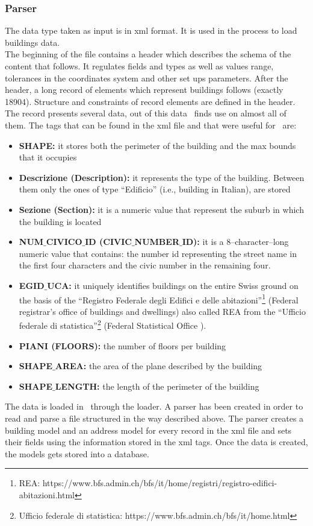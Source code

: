 \subsubsection{Parser}
The data type taken as input is in xml format. It is used in the process to load buildings data.\\
The beginning of the file contains a header which describes the schema of the content that follows.
It regulates fields and types as well as values range, tolerances in the coordinates system and other set ups parameters. After the header, a long record of elements which represent buildings follows (exactly 18904). Structure and constraints of record elements are defined in the header. The record presents several data, out of this data  \applicationName\ finds use on almost all of them. The tags that can be found in the xml file and that were useful for \applicationName\ are:
\begin{itemize}
	\item {\bf SHAPE:} it stores both the perimeter of the building and the max bounds that it occupies
	\item {\bf Descrizione (Description):} it represents the type of the building. Between them only the ones of type ``Edificio'' (i.e., building in Italian), are stored
	\item {\bf Sezione (Section):} it is a numeric value that represent the suburb in which the building is located
	\item {\bf NUM$\_$CIVICO$\_$ID (CIVIC$\_$NUMBER$\_$ID):} it is a 8--character--long numeric value that contains: the number id representing the street name in the first four characters and the civic number in the remaining four.
	\item {\bf EGID$\_$UCA:} it uniquely identifies buildings on the entire Swiss ground on the basis of the ``Registro Federale degli Edifici e delle abitazioni''\footnote{REA: https://www.bfs.admin.ch/bfs/it/home/registri/registro-edifici-abitazioni.html} (Federal registrar's office of buildings and dwellings) also called REA from the ``Ufficio federale di statistica''\footnote{Ufficio federale di statistica: https://www.bfs.admin.ch/bfs/it/home.html} (Federal Statistical Office
).
	\item {\bf PIANI (FLOORS):} the number of floors per building
	\item {\bf SHAPE$\_$AREA:} the area of the plane described by the building
	\item {\bf SHAPE$\_$LENGTH:} the length of the perimeter of the building
\end{itemize}
The data is loaded in \applicationName\ through the loader. A parser has been created in order to read and parse a file structured in the way described above. The parser creates a building model and an address model for every record in the xml file and sets their fields using the information stored in the xml tags. Once the data is created, the models gets stored into a database.\\


